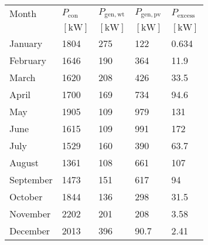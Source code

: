 \begin{table}
\label{tab: MonthlyPower}
\begin{tabular}{lllll}
\toprule
Month & $P_{\mathrm{con}}$ & $P_{\mathrm{gen,wt}}$ & $P_{\mathrm{gen,pv}}$ & $P_{\mathrm{excess}}$ \\
 & $\left[\mathrm{kW}\right]$ & $\left[\mathrm{kW}\right]$ & $\left[\mathrm{kW}\right]$ & $\left[\mathrm{kW}\right]$ \\
\midrule
January & 1804 & 275 & 122 & 0.634 \\
February & 1646 & 190 & 364 & 11.9 \\
March & 1620 & 208 & 426 & 33.5 \\
April & 1700 & 169 & 734 & 94.6 \\
May & 1905 & 109 & 979 & 131 \\
June & 1615 & 109 & 991 & 172 \\
July & 1529 & 160 & 390 & 63.7 \\
August & 1361 & 108 & 661 & 107 \\
September & 1473 & 151 & 617 & 94 \\
October & 1844 & 136 & 298 & 31.5 \\
November & 2202 & 201 & 208 & 3.58 \\
December & 2013 & 396 & 90.7 & 2.41 \\
\bottomrule
\end{tabular}
\end{table}
